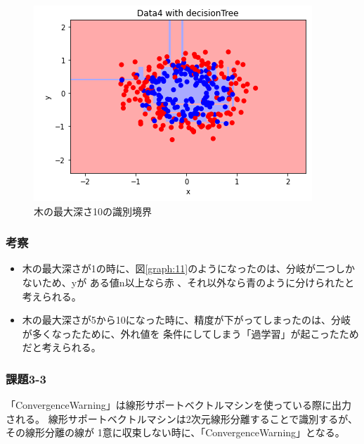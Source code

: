 \begin{figure}[htbp]
\begin{minipage}[t]{0.33\hsize}
    \centering
    \caption{木の最大深さ10の識別境界}
    \label{graph:13}
    \includegraphics[keepaspectratio, scale=0.5]{3-2-10.PNG}
  \end{minipage}
\end{figure}
\subsubsection{考察}
\begin{itemize}
  \item 木の最大深さが1の時に、図\ref{graph:11}のようになったのは、分岐が二つしかないため、yが
  ある値n以上なら赤
  、それ以外なら青のように分けられたと考えられる。
  \item 木の最大深さが5から10になった時に、精度が下がってしまったのは、分岐が多くなったために、外れ値を
  条件にしてしまう「過学習」が起こったためだと考えられる。
\end{itemize}
\clearpage

\subsubsection{課題3-3}
「ConvergenceWarning」は線形サポートベクトルマシンを使っている際に出力される。
線形サポートベクトルマシンは2次元線形分離することで識別するが、その線形分離の線が
1意に収束しない時に、「ConvergenceWarning」となる。
